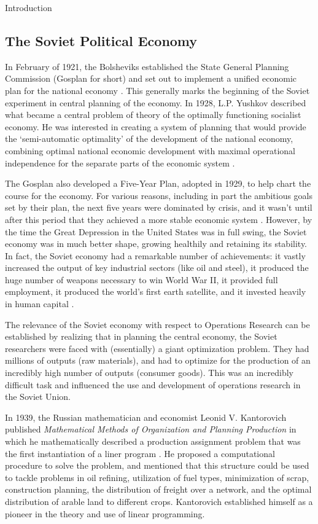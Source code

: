 \documentclass[12pt]{pom_thesis}
\theoremstyle{definition}
\begin{document}
\begin{chapter}{Introduction}
\subsection{The Soviet Political Economy}
	In February of 1921, the Bolsheviks established the State General Planning Commission (Gosplan for short) and set out to implement a unified economic plan for the national economy \cite{socialist-planning}. This generally marks the beginning of the Soviet experiment in central planning of the economy.  In 1928, L.P. Yushkov described what became a central problem of theory of the optimally functioning socialist economy. He was interested in creating a system of planning that would provide the `semi-automatic optimality' of the development of the national economy, combining optimal national economic development with maximal operational independence for the separate parts of the economic system \cite{planning-problems}. 
	
	The Gosplan also developed a Five-Year Plan, adopted in 1929, to help chart the course for the economy. For various reasons, including in part the ambitious goals set by their plan, the next five years were dominated by crisis, and it wasn't until after this period that they achieved a more stable economic system \cite{socialist-planning}. However, by the time the Great Depression in the United States was in full swing, the Soviet economy was in much better shape, growing healthily and retaining its stability. In fact, the Soviet economy had a remarkable number of achievements: it vastly increased the output of key industrial sectors (like oil and steel), it produced the huge number of weapons necessary to win World War II, it provided full employment, it produced the world's first earth satellite, and it invested heavily in human capital \cite{socialist-planning}.
	
	The relevance of the Soviet economy with respect to Operations Research can be established by realizing that in planning the central economy, the Soviet researchers were faced with (essentially) a giant optimization problem. They had millions of outputs (raw materials), and had to optimize for the production of an incredibly high number of outputs (consumer goods). This was an incredibly difficult task and influenced the use and development of operations research in the Soviet Union.
	
	In 1939, the Russian mathematician and economist Leonid V. Kantorovich published \textit{Mathematical Methods of Organization and Planning Production} in which he mathematically described a production assignment problem that was the first instantiation of a liner program \cite{or-timeline}. He proposed a computational procedure to solve the problem, and mentioned that this structure could be used to tackle problems in oil refining, utilization of fuel types, minimization of scrap, construction planning, the distribution of freight over a network, and the optimal distribution of arable land to different crops. Kantorovich established himself as a pioneer in the theory and use of linear programming.\\
%
%

\end{chapter}
\end{document}
